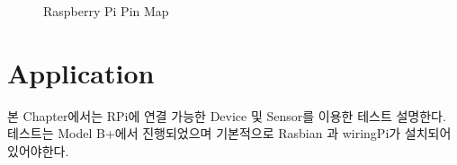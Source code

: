 \documentclass[11pt
  , a4paper
  , article
  , oneside
]{memoir}
\begin{document}
\begin{figure}
  \centering
  \hfill
  \caption{Raspberry Pi Pin Map}
  \label{fig:rpi_pin_map}
\end{figure}

\chapter{Application}
본 Chapter에서는 RPi에 연결 가능한 Device 및 Sensor를 이용한 테스트 설명한다. 테스트는 Model B+에서
진행되었으며 기본적으로 Rasbian 과 wiringPi가 설치되어 있어야한다.
\end{document}
